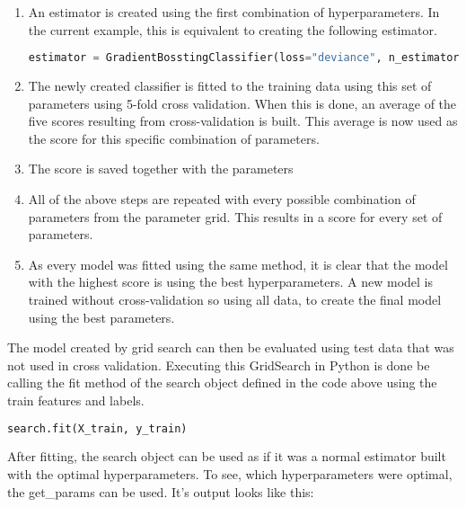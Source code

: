 \begin{enumerate}
    \item An estimator is created using the first combination of hyperparameters. In the current
    example, this is equivalent to creating the following estimator.
    \begin{lstlisting}[language=Python]
        estimator = GradientBosstingClassifier(loss="deviance", n_estimators=97, learning_rate=0.8, criterion='friedman_mse', min_samples_split=1, min_samples_leaf=1, max_depth=1, random_state=42, max_features=None)
    \end{lstlisting}
    \item The newly created classifier is fitted to the training data using this set of parameters using 5-fold cross validation.
    When this is done, an average of the five scores resulting from cross-validation is built.
    This average is now used as the score for this specific combination of parameters.
    \item The score is saved together with the parameters
    \item All of the above steps are repeated with every possible combination of parameters from the 
    parameter grid. This results in a score for every set of parameters.
    \item As every model was fitted using the same method, it is clear that the model with the highest
    score is using the best hyperparameters. A new model is trained without cross-validation so using all
    data, to create the final model using the best parameters.
\end{enumerate}

The model created by grid search can then be evaluated using test data that was not used in cross validation.
Executing this GridSearch in Python is done be calling the fit method of the search object defined in the code above 
using the train features and labels.

\begin{lstlisting}[language=Python]
    search.fit(X_train, y_train)
\end{lstlisting}

After fitting, the search object can be used as if it was a normal estimator built with the optimal 
hyperparameters.
To see, which hyperparameters were optimal, the get\_params can be used.
It's output looks like this:


